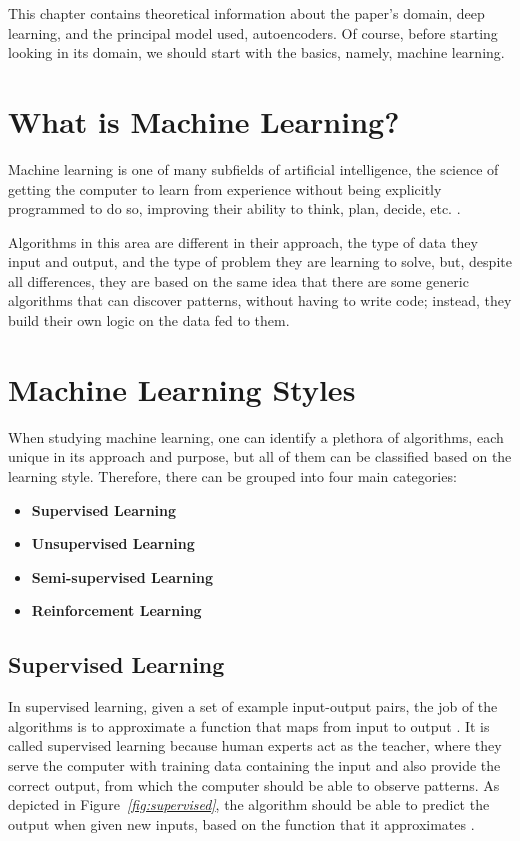 This chapter contains theoretical information about the paper's domain, deep learning,
and the principal model used, autoencoders.
Of course, before starting looking in its domain,
we should start with the basics, namely, machine learning.
\section{What is Machine Learning?}

Machine learning is one of many subfields of artificial intelligence,
the science of getting the computer to learn from experience
without being explicitly programmed to do so,
improving their ability to think, plan, decide, etc. \cite{whatIsML}.\par
Algorithms in this area are different in their approach, the type of data they input and output,
and the type of problem they are learning to
solve, but, despite all differences, they are based on the same idea that there are some
generic algorithms that can discover patterns,
without having to write code; instead, they build their own logic on the data fed to them.

\section{Machine Learning Styles}
When studying machine learning, one can identify a plethora of algorithms,
each unique in its approach and purpose, but all of them can be classified
based on the learning style. Therefore, there can be grouped into four main categories:
\begin{itemize}
    \item \textbf{Supervised Learning}
    \item \textbf{Unsupervised Learning}
    \item \textbf{Semi-supervised Learning}
    \item \textbf{Reinforcement Learning}
\end{itemize}
\vspace{0.5cm}

\subsection{Supervised Learning}
In supervised learning, given a set of example input-output pairs,
the job of the algorithms is to approximate a function that maps from input to output \cite{amai}.
It is called supervised learning because human experts act as the teacher,
where they serve the computer with training data containing the input and
also provide the correct output, from which the computer should be able to observe patterns.
As depicted in Figure\emph{~\ref{fig:supervised}},
the algorithm should be able to predict the output when given new inputs,
based on the function that it approximates \cite{typesMLMedium}.


